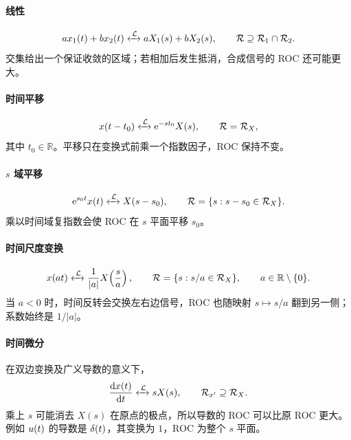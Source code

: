 \paragraph{线性}
\begin{equation}
  a x_1(t)+b x_2(t)
  \mathrel{\xleftrightarrow{\,\mathcal{L}\,}} aX_1(s)+bX_2(s),
  \qquad
  \mathcal R\supseteq\mathcal R_1\cap\mathcal R_2.
  \label{eq:laplace-linearity}
\end{equation}
交集给出一个保证收敛的区域；若相加后发生抵消，合成信号的 ROC 还可能更大。

\paragraph{时间平移}
\begin{equation}
  x(t-t_0)
  \mathrel{\xleftrightarrow{\,\mathcal{L}\,}} \mathrm{e}^{-st_0}X(s),
  \qquad
  \mathcal R=\mathcal R_X,
  \label{eq:laplace-time-shift}
\end{equation}
其中 $t_0\in\mathbb{R}$。平移只在变换式前乘一个指数因子，ROC 保持不变。

\paragraph{$s$ 域平移}
\begin{equation}
  \mathrm{e}^{s_0t}x(t)
  \mathrel{\xleftrightarrow{\,\mathcal{L}\,}} X(s-s_0),
  \qquad
  \mathcal R=\{s:s-s_0\in\mathcal R_X\}.
  \label{eq:laplace-s-shift}
\end{equation}
乘以时间域复指数会使 ROC 在 $s$ 平面平移 $s_0$。

\paragraph{时间尺度变换}
\begin{equation}
  x(at)
  \mathrel{\xleftrightarrow{\,\mathcal{L}\,}} \frac{1}{|a|}X\!\left(\frac{s}{a}\right),
  \qquad
  \mathcal R=\{s:s/a\in\mathcal R_X\},
  \qquad a\in\mathbb{R}\setminus\{0\}.
  \label{eq:laplace-time-scaling}
\end{equation}
当 $a<0$ 时，时间反转会交换左右边信号，ROC 也随映射 $s\mapsto s/a$ 翻到另一侧；系数始终是 $1/|a|$。

\paragraph{时间微分}
在双边变换及广义导数的意义下，
\begin{equation}
  \frac{\mathop{}\!\mathrm{d} x(t)}{\mathop{}\!\mathrm{d} t}
  \mathrel{\xleftrightarrow{\,\mathcal{L}\,}} sX(s),
  \qquad
  \mathcal R_{x'}\supseteq\mathcal R_X.
  \label{eq:laplace-time-differentiation}
\end{equation}
乘上 $s$ 可能消去 $X(s)$ 在原点的极点，所以导数的 ROC 可以比原 ROC 更大。例如 $u(t)$ 的导数是 $\delta(t)$，其变换为 $1$，ROC 为整个 $s$ 平面。

